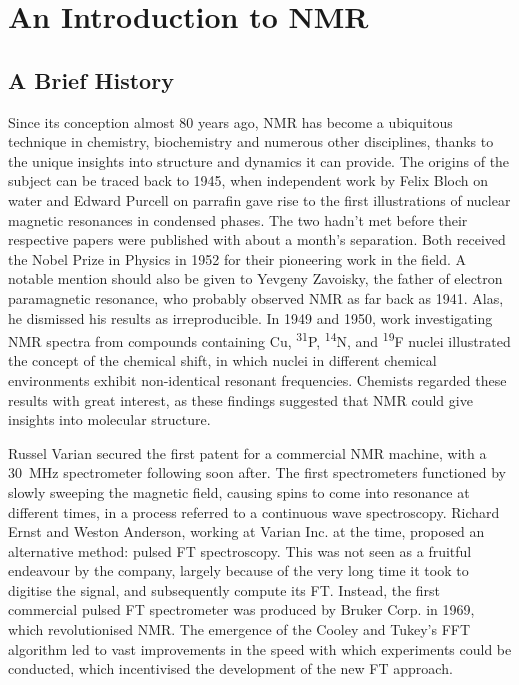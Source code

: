 \section{An Introduction to \acs{NMR}}

\subsection{A Brief History}
Since its conception almost 80 years ago, \ac{NMR} has become a ubiquitous
technique in chemistry, biochemistry and numerous other disciplines, thanks to
the unique insights into structure and dynamics it can provide.
The origins of the subject can be traced back to 1945, when independent work by
Felix Bloch on water\cite{Bloch1946} and Edward Purcell on
parrafin\cite{Purcell1946} gave rise to the first illustrations of nuclear
magnetic resonances in condensed phases. The two hadn't met before their
respective papers were published with about a month's
separation\cite{Becker1993}. Both received the Nobel Prize in Physics in 1952
for their pioneering work in the field. A notable mention should also be given
to Yevgeny Zavoisky, the father of electron paramagnetic resonance, who
probably observed NMR as far back as 1941\cite{Eaton1998}. Alas, he dismissed
his results as irreproducible. In 1949 and 1950, work investigating \ac{NMR}
spectra from compounds containing Cu, \textsuperscript{31}P,
\textsuperscript{14}N, and \textsuperscript{19}F nuclei illustrated the concept
of the chemical shift\cite{Knight1949, Proctor1950, Dickinson1950}, in which
nuclei in different chemical environments exhibit non-identical resonant
frequencies.  Chemists regarded these results with great interest, as these
findings suggested that \ac{NMR} could give insights into molecular structure.

Russel Varian secured the first patent for a commercial \ac{NMR} machine, with
a \qty{30}{\mega\hertz} spectrometer following soon after. The first
spectrometers functioned by slowly sweeping the magnetic field,
causing spins to come into resonance at different times, in a process referred
to a continuous wave spectroscopy. Richard Ernst and
Weston Anderson, working at Varian Inc. at the time, proposed an alternative
method: pulsed \ac{FT} spectroscopy\cite{Ernst1966}. This was not seen as a
fruitful endeavour by the company, largely because of the very long time it
took to digitise the signal, and subsequently compute its FT\cite{Freeman2015}.
Instead, the first commercial pulsed \ac{FT} spectrometer was produced by
Bruker Corp. in 1969, which revolutionised NMR. The emergence of the
Cooley and Tukey's \ac{FFT} algorithm\cite{Cooley1965} led to vast improvements
in the speed with which experiments could be conducted, which incentivised the
development of the new \ac{FT} approach.

